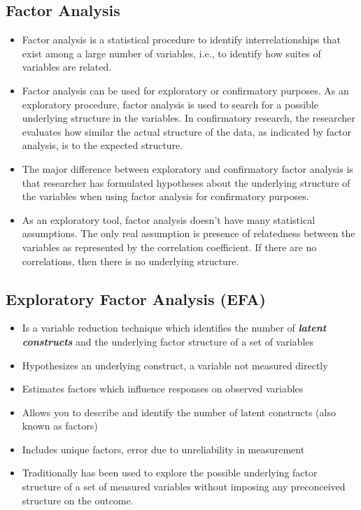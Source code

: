 \documentclass[a4paper,12pt]{article}
\begin{document}
\subsection{Factor Analysis}
\begin{itemize}
	\item Factor analysis is a statistical procedure to identify interrelationships that
	exist among a large number of variables, i.e.,  to identify how suites of
	variables are related.
	
		\item Factor analysis can be used for exploratory or confirmatory purposes.
	As an exploratory procedure, factor analysis is used to search for a
	possible underlying structure in the variables. In confirmatory research,
	the researcher evaluates how similar the actual structure of the data, as
	indicated by factor analysis, is to the expected structure.
	
		\item The major difference between exploratory and confirmatory factor
	analysis is that researcher has formulated hypotheses about the
	underlying structure of the variables when using factor analysis for
	confirmatory purposes.
	
		\item As an exploratory tool, factor analysis doesn't have many statistical
	assumptions. The only real assumption is presence of relatedness
	between the variables as represented by the correlation coefficient. If
	there are no correlations, then there is no underlying structure.
\end{itemize}


\subsection{Exploratory Factor Analysis (EFA)}
\begin{itemize}
\item Is a variable reduction technique which identifies the number of \textbf{\emph{latent constructs}} and the underlying factor
structure of a set of variables
\item Hypothesizes an underlying construct, a variable not measured directly
\item Estimates factors which influence responses on observed variables
\item Allows you to describe and identify the number of latent constructs (also known as factors)
\item Includes unique factors, error due to unreliability in measurement
\item Traditionally has been used to explore the possible underlying factor structure of a set of measured variables without imposing any preconceived structure on the outcome.
\end{itemize}
\end{document}
